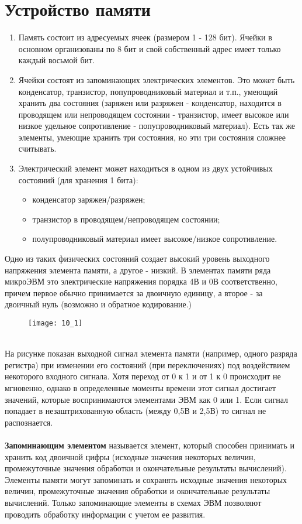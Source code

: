 \section{Устройство памяти}
\begin{enumerate}
 \item Память состоит из адресуемых ячеек (размером 1 - 128 бит). Ячейки в основном организованы по 8 бит и свой собственный адрес имеет только каждый восьмой бит.
 \item Ячейки состоят из запоминающих электрических элементов. Это может быть конденсатор, транзистор, попупроводниковый материал и т.п., умеющий хранить два состояния (заряжен или разряжен - конденсатор, находится в проводящем или непроводящем состоянии - транзистор, имеет высокое или низкое удельное сопротивление - попупроводниковый материал). Есть так же элементы, умеющие хранить три состояния, но эти три состояния сложнее считывать.
 \item Электрический элемент может находиться в одном из двух устойчивых состояний (для хранения 1 бита):
 \begin{itemize}
   \item конденсатор заряжен/разряжен;
   \item транзистор в проводящем/непроводящем состоянии;
   \item полупроводниковый материал имеет высокое/низкое сопротивление.
 \end{itemize}
\end{enumerate}
Одно из таких физических состояний создает высокий уровень выходного напряжения элемента памяти, а другое - низкий. В элементах памяти ряда микроЭВМ это электрические напряжения порядка 4В и 0В соответственно, причем первое обычно принимается за двоичную единицу, а второе - за двоичный нуль (возможно и обратное кодирование.)
\begin{figure}[h]
\texttt{[image: 10\_1]}
\end{figure}
\\На рисунке показан выходной сигнал элемента памяти (например, одного разряда регистра) при изменении его состояний (при переключениях) под воздействием некоторого входного сигнала. Хотя переход от 0 к 1 и от 1 к 0 происходит не мгновенно, однако в определенные моменты времени этот сигнал достигает значений, которые воспринимаются элементами ЭВМ как 0 или 1. Если сигнал попадает в незаштрихованную область (между 0,5В и 2,5В) то сигнал не распознается.
\\
\\\textbf{Запоминающим элементом} называется элемент, который способен принимать и хранить код двоичной цифры (исходные значения некоторых величин, промежуточные значения обработки и окончательные результаты вычислений). Элементы памяти могут запоминать и сохранять исходные значения некоторых величин, промежуточные значения обработки и окончательные результаты вычислений. Только запоминающие элементы в схемах ЭВМ позволяют проводить обработку информации с учетом ее развития.
